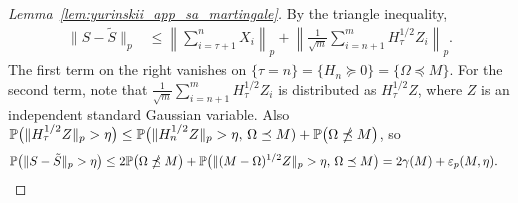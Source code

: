 \begin{proof}[Lemma~\ref{lem:yurinskii_app_sa_martingale}]
  By the triangle inequality,
  \begin{align*}
    \|S - \tilde S \|_p
    &\leq
    \left\| \sum_{i=\tau+1}^n X_i \right\|_p
    + \left\| \frac{1}{\sqrt{m}} \sum_{i=n+1}^m H_\tau^{1/2} Z_i \right\|_p.
  \end{align*}
  The first term on the right vanishes on
  $\{\tau = n\} = \{H_n \succeq 0\} = \{\Omega \preceq M\}$.
  For the second term, note that
  $\tfrac{1}{\sqrt{m}}\sum_{i=n+1}^m H_\tau^{1/2} Z_i$
  is distributed as $H_\tau^{1/2}Z$,
  where $Z$ is an independent standard Gaussian variable.
  Also
  $\P\big( \| H_\tau^{1/2} Z \|_p > \eta \big)
  \leq \P\big( \| H_n^{1/2} Z \|_p > \eta,\, \Omega \preceq M)
  + \P\big( \Omega \npreceq M \big)$,
  so
  \begin{align*}%
    \label{eq:yurinskii_app_approx_modified_original}
    \P\big( \| S - \tilde S \|_p > \eta\big)
    &\leq
    2 \P\big(\Omega \npreceq M \big)
    + \P\big( \| (M-\Omega)^{1/2}Z \|_p > \eta,\,
    \Omega \preceq M \big)
    = 2 \gamma(M) + \varepsilon_p(M, \eta).
  \end{align*}



\end{proof}
